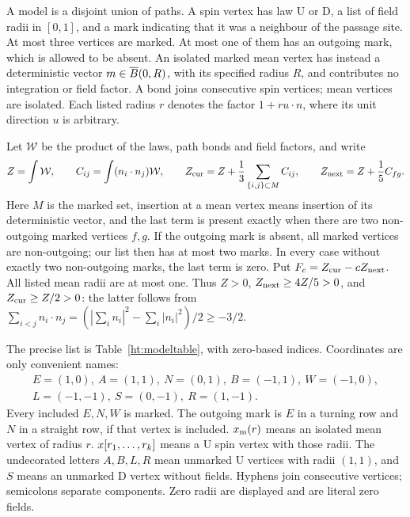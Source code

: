 \begin{htdef}\label{ht:models}
A model is a disjoint union of paths. A spin vertex has law U or D,
a list of field radii in \([0,1]\), and a mark indicating that it was a
neighbour of the passage site. At most three vertices are marked.
At most one of them has an outgoing mark, which is allowed to be absent.
An isolated marked mean vertex has instead a deterministic vector
\(m\in\overline B(0,R)\), with its specified radius \(R\), and contributes
no integration or field factor. A bond joins consecutive spin vertices;
mean vertices are isolated. Each listed radius \(r\) denotes the factor
\(1+ru\cdot n\), where its unit direction \(u\) is arbitrary.

Let \(\mathcal W\) be the product of the laws, path bonds and field
factors, and write
\begin{equation}\label{ht:polynomials}
 Z=\int\mathcal W,\qquad
 C_{ij}=\int (n_i\cdot n_j)\mathcal W,\qquad
 Z_{\rm cur}=Z+\frac13\sum_{\{i,j\}\subset M}C_{ij},\qquad
 Z_{\rm next}=Z+\frac15 C_{fg}.
\end{equation}
Here \(M\) is the marked set, insertion at a mean vertex means insertion
of its deterministic vector, and the last term is present exactly when
there are two non-outgoing marked vertices \(f,g\). If the outgoing mark
is absent, all marked vertices are non-outgoing; our list then has at
most two marks. In every case without exactly two non-outgoing marks, the last term is
zero. Put \(F_c=Z_{\rm cur}-cZ_{\rm next}\). All listed mean radii are at
most one. Thus \(Z>0\), \(Z_{\rm next}\ge4Z/5>0\), and
\(Z_{\rm cur}\ge Z/2>0\): the latter follows from
\(\sum_{i<j}n_i\cdot n_j=(|\sum_i n_i|^2-\sum_i|n_i|^2)/2
\ge-3/2\).

The precise list is Table~\ref{ht:modeltable}, with zero-based indices.
Coordinates are only convenient names:
\[
 \begin{gathered}
 E=(1,0),\ A=(1,1),\ N=(0,1),\ B=(-1,1),\ W=(-1,0),\\
 L=(-1,-1),\ S=(0,-1),\ R=(1,-1).
 \end{gathered}
\]
Every included \(E,N,W\) is marked. The outgoing mark is \(E\) in a
turning row and \(N\) in a straight row, if that vertex is included.
\(x_{\rm m}(r)\) means an isolated mean vertex of radius \(r\).
\(x[r_1,\ldots,r_k]\) means a U spin vertex with those radii.
The undecorated letters \(A,B,L,R\) mean unmarked U vertices with
radii \((1,1)\), and \(S\) means an unmarked D vertex without fields.
Hyphens join consecutive vertices; semicolons separate components.
Zero radii are displayed and are literal zero fields.
\end{htdef}

